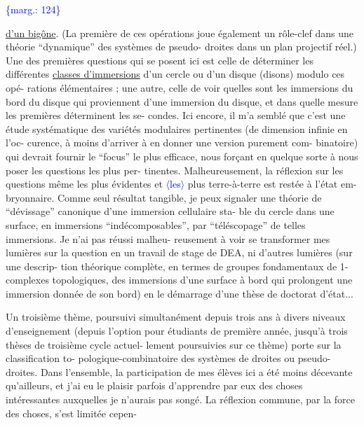 \documentclass[11pt]{article}
\newcommand{\scanpage}[1]{\par\bigskip\noindent{\small\sffamily[scan #1]}\par}
\newcommand{\mspage}[1]{{\small\sffamily[p.\,#1]}}
\newcommand{\inserted}[2][]{\textcolor{blue}{$\langle$#2$\rangle$}}
\newcommand{\margin}[1]{\textcolor{blue}{\{\textsf{marg.:} #1\}}}
\newcommand{\uline}[1]{\underline{#1}}
\begin{document}
\margin{124}

\clearpage
\scanpage{119/125}
\mspage{47}

\uline{d'un bigône}. (La première de ces opérations joue également un
rôle-clef dans une théorie ``dynamique'' des systèmes de pseudo-%
droites dans un plan projectif réel.) Une des premières questions
qui se posent ici est celle de déterminer les différentes \uline{classes
d'immersions} d'un cercle ou d'un disque (disons) modulo ces opé-%
rations élémentaires ; une autre, celle de voir quelles sont les
immersions du bord du disque qui proviennent d'une immersion du
disque, et dans quelle mesure les premières déterminent les se-%
condes. Ici encore, il m'a semblé que c'est une étude systématique
des variétés modulaires pertinentes (de dimension infinie en l'oc-%
curence, à moins d'arriver à en donner une version purement com-%
binatoire) qui devrait fournir le ``focus'' le plus efficace, nous
forçant en quelque sorte à nous poser les questions les plus per-%
tinentes. Malheureusement, la réflexion sur les questions même
les plus évidentes et \inserted{les} plus terre-à-terre est restée à l'état em-%
bryonnaire. Comme seul résultat tangible, je peux signaler une
théorie de ``dévissage'' canonique d'une immersion cellulaire sta-%
ble du cercle dans une surface, en immersions ``indécomposables'',
par ``téléscopage'' de telles immersions. Je n'ai pas réussi malheu-%
reusement à voir se transformer mes lumières sur la question en
un travail de stage de DEA, ni d'autres lumières (sur une descrip-%
tion théorique complète, en termes de groupes fondamentaux de
1-complexes topologiques, des immersions d'une surface à bord qui
prolongent une immersion donnée de son bord) en le démarrage d'une
thèse de doctorat d'état...

Un troisième thème, poursuivi simultanément depuis trois
ans à divers niveaux d'enseignement (depuis l'option pour étudiants
de première année, jusqu'à trois thèses de troisième cycle actuel-%
lement poursuivies sur ce thème) porte sur la classification to-%
pologique-combinatoire des systèmes de droites ou pseudo-droites.
Dans l'ensemble, la participation de mes élèves ici a été moins
décevante qu'ailleurs, et j'ai eu le plaisir parfois d'apprendre
par eux des choses intéressantes auxquelles je n'aurais pas songé.
La réflexion commune, par la force des choses, s'est limitée cepen-%
\end{document}
